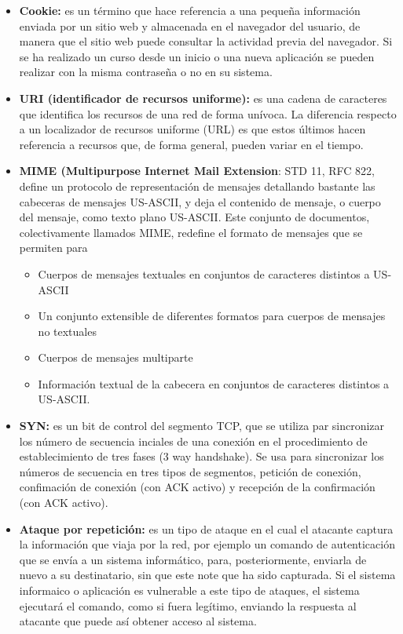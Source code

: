 \documentclass[a4paper,11pt]{article}
\begin{document}
\begin{itemize}
\item \textbf{Cookie:} es un término que hace referencia a una pequeña información enviada por un sitio web y almacenada en el navegador del usuario, de manera que el sitio web puede consultar la actividad previa del navegador. Si se ha realizado un curso desde un inicio o una nueva aplicación se pueden realizar con la misma contraseña o no en su sistema.

\item \textbf{URI (identificador de recursos uniforme):} es una cadena de caracteres que identifica los recursos de una red de forma unívoca. La diferencia respecto a un localizador de recursos uniforme (URL) es que estos últimos hacen referencia a recursos que, de forma general, pueden variar en el tiempo.

\item \textbf{MIME (Multipurpose Internet Mail Extension}: STD 11, RFC 822, define un protocolo de representación de mensajes detallando bastante las cabeceras de mensajes US-ASCII, y deja el contenido de mensaje, o cuerpo del mensaje, como texto plano US-ASCII. Este conjunto de documentos, colectivamente llamados MIME, redefine el formato de mensajes que se permiten para
	\begin{itemize}
		\item Cuerpos de mensajes textuales en conjuntos de caracteres distintos a US-ASCII
		\item Un conjunto extensible de diferentes formatos para cuerpos de mensajes no textuales
		\item Cuerpos de mensajes multiparte
		\item  Información textual de la cabecera en conjuntos de caracteres distintos a US-ASCII.
	\end{itemize}

\item \textbf{SYN:} es un bit de control del segmento TCP, que se utiliza par sincronizar los número de secuencia inciales de una conexión en el procedimiento de establecimiento de tres fases (3 way handshake). Se usa para sincronizar los números de secuencia en tres tipos de segmentos, petición de conexión, confimación de conexión (con ACK activo) y recepción de la confirmación (con ACK activo).	  

\item \textbf{Ataque por repetición:} es un tipo de ataque en el cual el atacante captura la información que viaja por la red, por ejemplo un comando de autenticación que se envía a un sistema informático, para, posteriormente, enviarla de nuevo a su destinatario, sin que este note que ha sido capturada. Si el sistema informaico o aplicación es vulnerable a este tipo de ataques, el sistema ejecutará el comando, como si fuera legítimo, enviando la respuesta al atacante que puede así obtener acceso al sistema.


\end{itemize}
\end{document}
